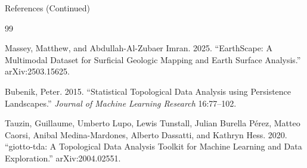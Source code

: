 \documentclass{beamer}
\begin{document}
\begin{frame}{References (Continued)}
\begin{thebibliography}{99}

Massey, Matthew, and Abdullah-Al-Zubaer Imran. 2025. ``EarthScape: A Multimodal Dataset for Surficial Geologic Mapping and Earth Surface Analysis.'' arXiv:2503.15625.

Bubenik, Peter. 2015. ``Statistical Topological Data Analysis using Persistence Landscapes.'' \textit{Journal of Machine Learning Research} 16:77--102.

Tauzin, Guillaume, Umberto Lupo, Lewis Tunstall, Julian Burella P\'{e}rez, Matteo Caorsi, Anibal Medina-Mardones, Alberto Dassatti, and Kathryn Hess. 2020. ``giotto-tda: A Topological Data Analysis Toolkit for Machine Learning and Data Exploration.'' arXiv:2004.02551.

\end{thebibliography}
\end{frame}
\end{document}
